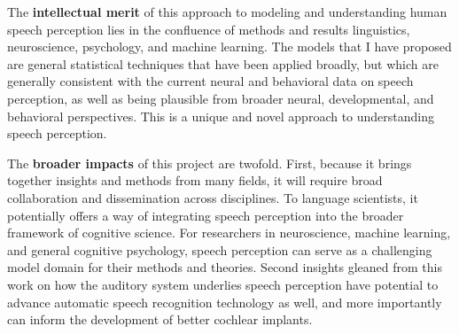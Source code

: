 \documentclass[12pt]{article}
\begin{document}

The \textbf{intellectual merit} of this approach to modeling and understanding human speech perception lies in the confluence of methods and results linguistics, neuroscience, psychology, and machine learning.  The models that I have proposed are general statistical techniques that have been applied broadly, but which are generally consistent with the current neural and behavioral data on speech perception, as well as being plausible from broader neural, developmental, and behavioral perspectives.  This is a unique and novel approach to understanding speech perception.

The \textbf{broader impacts} of this project are twofold.  First, because it brings together insights and methods from many fields, it will require broad collaboration and dissemination across disciplines.  To language scientists, it potentially offers a way of integrating speech perception into the broader framework of cognitive science.  For researchers in neuroscience, machine learning, and general cognitive psychology, speech perception can serve as a challenging model domain for their methods and theories.  Second insights gleaned from this work on how the auditory system underlies speech perception have potential to advance automatic speech recognition technology as well, and more importantly can inform the development of better cochlear implants.


%

{
\fontsize{10}{10}
\selectfont

}
\end{document}
